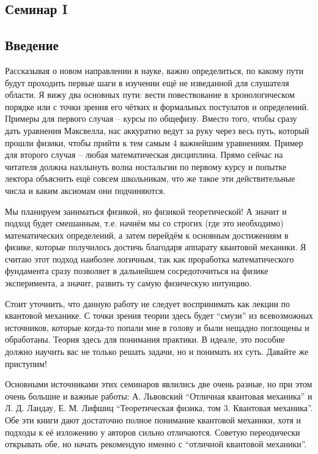 \begin{center}
    \section{Семинар I}
\end{center}
\subsection{Введение}


\hspace{1em} Рассказывая о новом направлении в науке, важно определиться, по какому пути будут проходить первые шаги в изучении ещё не изведанной для слушателя области. Я вижу два основных пути: вести повествование в хронологическом порядке или с точки зрения его чётких и формальных постулатов и определений. Примеры для первого случая -- курсы по общефизу. Вместо того, чтобы сразу дать уравнения Максвелла, нас аккуратно ведут за руку через весь путь, который прошли физики, чтобы прийти к тем самым 4 важнейшим уравнениям. Пример для второго случая -- любая математическая дисциплина. Прямо сейчас на читателя должна нахлынуть волна ностальгии по первому курсу и попытке лектора объяснить ещё совсем школьникам, что же такое эти действительные числа и каким аксиомам они подчиняются.

Мы планируем заниматься физикой, но физикой теоретической! А значит и подход будет смешанным, т.е. начнём мы со строгих (где это необходимо) математических определений, а затем перейдём к основным достижениям в физике, которые получилось достичь благодаря аппарату квантовой механики. Я считаю этот подход наиболее логичным, так как проработка математического фундамента сразу позволяет в дальнейшем сосредоточиться на физике эксперимента, а значит, развить ту самую физическую интуицию.

Стоит уточнить, что данную работу не следует воспринимать как лекции по квантовой механике. С точки зрения теории здесь будет ``смузи'' из всевозможных источников, которые когда-то попали мне в голову и были нещадно поглощены и обработаны. Теория здесь для понимания практики. В идеале, это пособие должно научить вас не только решать задачи, но и понимать их суть. Давайте же приступим!

Основными источниками этих семинаров явлились две очень разные, но при этом очень большие и важные работы: А. Львовский ``Отличная квантовая механика'' и Л. Д. Ландау, Е. М. Лифшиц ``Теоретическая физика, том 3. Квантовая механика''. Обе эти книги дают достаточно полное понимание квантовой механики, хотя и подходы к её изложению у авторов сильно отличаются. Советую переодически открывать обе, но начать рекомендую именно с ``отличной квантовой механики''.

